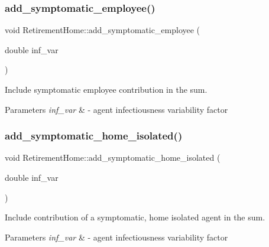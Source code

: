 \subsubsection{\texorpdfstring{add\+\_\+symptomatic\+\_\+employee()}{add\_symptomatic\_employee()}}
{\footnotesize\ttfamily void Retirement\+Home\+::add\+\_\+symptomatic\+\_\+employee (\begin{DoxyParamCaption}\item[{double}]{inf\+\_\+var }\end{DoxyParamCaption})\hspace{0.3cm}{\ttfamily [inline]}}



Include symptomatic employee contribution in the sum. 


\begin{DoxyParams}{Parameters}
{\em inf\+\_\+var} & -\/ agent infectiousness variability factor \\
\hline
\end{DoxyParams}
\mbox{\label{classRetirementHome_a8c7f00431e809d16b335d18daf512df1}} 
\subsubsection{\texorpdfstring{add\+\_\+symptomatic\+\_\+home\+\_\+isolated()}{add\_symptomatic\_home\_isolated()}}
{\footnotesize\ttfamily void Retirement\+Home\+::add\+\_\+symptomatic\+\_\+home\+\_\+isolated (\begin{DoxyParamCaption}\item[{double}]{inf\+\_\+var }\end{DoxyParamCaption})\hspace{0.3cm}{\ttfamily [inline]}}



Include contribution of a symptomatic, home isolated agent in the sum. 


\begin{DoxyParams}{Parameters}
{\em inf\+\_\+var} & -\/ agent infectiousness variability factor \\
\hline
\end{DoxyParams}
\mbox{\label{classRetirementHome_aafab41675600b03fdffcf11db1a07ec7}} 
